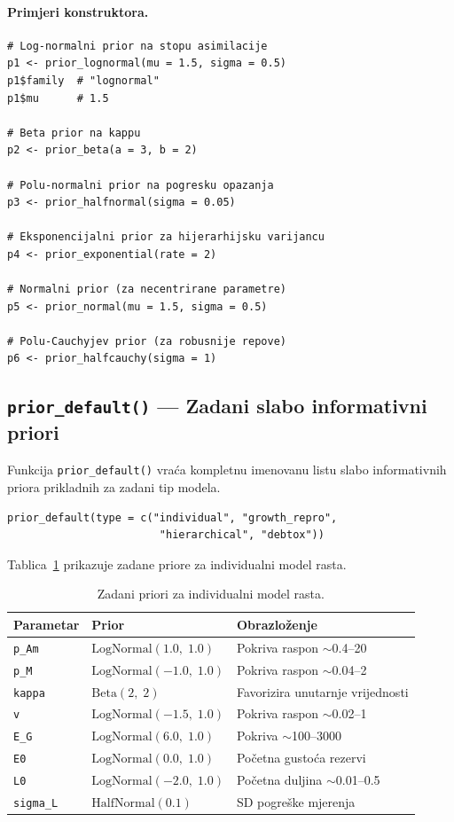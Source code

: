 \documentclass[11pt,a4paper]{article}
\newcommand{\fn}[1]{\texttt{#1()}}
\newcommand{\code}[1]{\texttt{#1}}
\begin{document}
\paragraph{Primjeri konstruktora.}
\begin{lstlisting}
# Log-normalni prior na stopu asimilacije
p1 <- prior_lognormal(mu = 1.5, sigma = 0.5)
p1$family  # "lognormal"
p1$mu      # 1.5

# Beta prior na kappu
p2 <- prior_beta(a = 3, b = 2)

# Polu-normalni prior na pogresku opazanja
p3 <- prior_halfnormal(sigma = 0.05)

# Eksponencijalni prior za hijerarhijsku varijancu
p4 <- prior_exponential(rate = 2)

# Normalni prior (za necentrirane parametre)
p5 <- prior_normal(mu = 1.5, sigma = 0.5)

# Polu-Cauchyjev prior (za robusnije repove)
p6 <- prior_halfcauchy(sigma = 1)
\end{lstlisting}


\subsection{\fn{prior\_default} --- Zadani slabo informativni priori}

Funkcija \fn{prior\_default} vraća kompletnu imenovanu listu slabo
informativnih priora prikladnih za zadani tip modela.

\begin{lstlisting}
prior_default(type = c("individual", "growth_repro",
                        "hierarchical", "debtox"))
\end{lstlisting}

Tablica~\ref{tab:zadani-priori} prikazuje zadane priore za individualni
model rasta.

\begin{table}[H]
\centering
\caption{Zadani priori za individualni model rasta.}
\label{tab:zadani-priori}
\begin{tabular}{lll}
\toprule
\textbf{Parametar} & \textbf{Prior} & \textbf{Obrazloženje} \\
\midrule
\code{p\_Am}    & $\text{LogNormal}(1.0,\; 1.0)$   & Pokriva raspon $\sim$0.4--20 \\
\code{p\_M}     & $\text{LogNormal}(-1.0,\; 1.0)$  & Pokriva raspon $\sim$0.04--2 \\
\code{kappa}    & $\text{Beta}(2,\; 2)$             & Favorizira unutarnje vrijednosti \\
\code{v}        & $\text{LogNormal}(-1.5,\; 1.0)$   & Pokriva raspon $\sim$0.02--1 \\
\code{E\_G}     & $\text{LogNormal}(6.0,\; 1.0)$    & Pokriva $\sim$100--3000 \\
\code{E0}       & $\text{LogNormal}(0.0,\; 1.0)$    & Početna gustoća rezervi \\
\code{L0}       & $\text{LogNormal}(-2.0,\; 1.0)$   & Početna duljina $\sim$0.01--0.5 \\
\code{sigma\_L} & $\text{HalfNormal}(0.1)$          & SD pogreške mjerenja \\
\bottomrule
\end{tabular}
\end{table}
\end{document}
